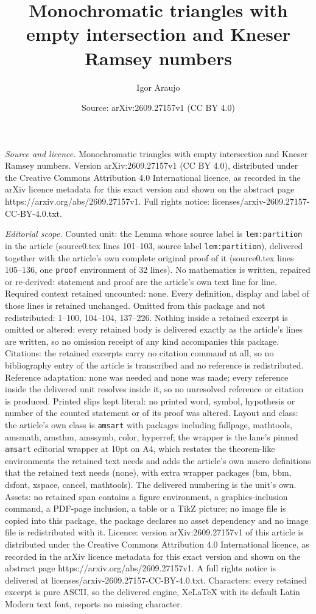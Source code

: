 \documentclass[10pt,a4paper]{amsart}
\title[Monochromatic triangles with empty intersection and Kneser R]{Monochromatic triangles with empty intersection and Kneser Ramsey numbers}
\author{Igor Araujo}
\date{Source: arXiv:2609.27157v1 (CC BY 4.0)}
\begin{document}
\maketitle

\noindent\emph{Source and licence.} Monochromatic triangles with empty intersection and Kneser Ramsey numbers. Version arXiv:2609.27157v1 (CC BY 4.0), distributed under the Creative Commons Attribution 4.0 International licence, as recorded in the arXiv licence metadata for this exact version and shown on the abstract page https://arxiv.org/abs/2609.27157v1. Full rights notice: licenses/arxiv-2609.27157-CC-BY-4.0.txt.\par\smallskip

\noindent\textit{Editorial scope.} Counted unit: the Lemma whose source label is \texttt{lem:partition} in the article (source0.tex lines 101--103, source label \texttt{lem:partition}), delivered together with the article's own complete original proof of it (source0.tex lines 105--136, one \texttt{proof} environment of 32 lines). No mathematics is written, repaired or re-derived: statement and proof are the article's own text line for line. Required context retained uncounted: none. Every definition, display and label of those lines is retained unchanged. Omitted from this package and not redistributed: 1--100, 104--104, 137--226. Nothing inside a retained excerpt is omitted or altered: every retained body is delivered exactly as the article's lines are written, so no omission receipt of any kind accompanies this package. Citations: the retained excerpts carry no citation command at all, so no bibliography entry of the article is transcribed and no reference is redistributed. Reference adaptation: none was needed and none was made; every reference inside the delivered unit resolves inside it, so no unresolved reference or citation is produced. Printed slips kept literal: no printed word, symbol, hypothesis or number of the counted statement or of its proof was altered. Layout and class: the article's own class is \texttt{amsart} with packages including fullpage, mathtools, amsmath, amsthm, amssymb, color, hyperref; the wrapper is the lane's pinned \texttt{amsart} editorial wrapper at 10pt on A4, which restates the theorem-like environments the retained text needs and adds the article's own macro definitions that the retained text needs (none), with extra wrapper packages (bm, bbm, dsfont, xspace, cancel, mathtools). The delivered numbering is the unit's own. Assets: no retained span contains a figure environment, a graphics-inclusion command, a PDF-page inclusion, a table or a TikZ picture; no image file is copied into this package, the package declares no asset dependency and no image file is redistributed with it. Licence: version arXiv:2609.27157v1 of this article is distributed under the Creative Commons Attribution 4.0 International licence, as recorded in the arXiv licence metadata for this exact version and shown on the abstract page https://arxiv.org/abs/2609.27157v1. A full rights notice is delivered at licenses/arxiv-2609.27157-CC-BY-4.0.txt. Characters: every retained excerpt is pure ASCII, so the delivered engine, XeLaTeX with its default Latin Modern text font, reports no missing character.
\end{document}
